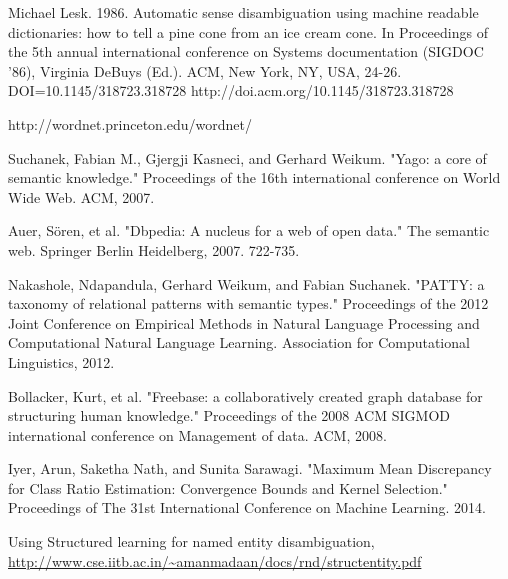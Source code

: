 \begin{thebibliography}{9}
 \label{lesk}
Michael Lesk. 1986. Automatic sense disambiguation using machine readable dictionaries: how to tell a pine cone from an ice cream cone. In Proceedings of the 5th annual international conference on Systems documentation (SIGDOC '86), Virginia DeBuys (Ed.). ACM, New York, NY, USA, 24-26. DOI=10.1145/318723.318728 http://doi.acm.org/10.1145/318723.318728

 \label{wordnet}
http://wordnet.princeton.edu/wordnet/

 \label{yago}
Suchanek, Fabian M., Gjergji Kasneci, and Gerhard Weikum. "Yago: a core of semantic knowledge." Proceedings of the 16th international conference on World Wide Web. ACM, 2007.

 \label{dbpedia}
Auer, Sören, et al. "Dbpedia: A nucleus for a web of open data." The semantic web. Springer Berlin Heidelberg, 2007. 722-735.

 \label{patty}
Nakashole, Ndapandula, Gerhard Weikum, and Fabian Suchanek. "PATTY: a taxonomy of relational patterns with semantic types." Proceedings of the 2012 Joint Conference on Empirical Methods in Natural Language Processing and Computational Natural Language Learning. Association for Computational Linguistics, 2012.

 \label{freebase}
Bollacker, Kurt, et al. "Freebase: a collaboratively created graph database for structuring human knowledge." Proceedings of the 2008 ACM SIGMOD international conference on Management of data. ACM, 2008.

 \label{mmd}
Iyer, Arun, Saketha Nath, and Sunita Sarawagi. "Maximum Mean Discrepancy for Class Ratio Estimation: Convergence Bounds and Kernel Selection." Proceedings of The 31st International Conference on Machine Learning. 2014.

 \label{aidafeature}
Using Structured learning for named entity disambiguation, \url{http://www.cse.iitb.ac.in/~amanmadaan/docs/rnd/structentity.pdf}
\end{thebibliography}